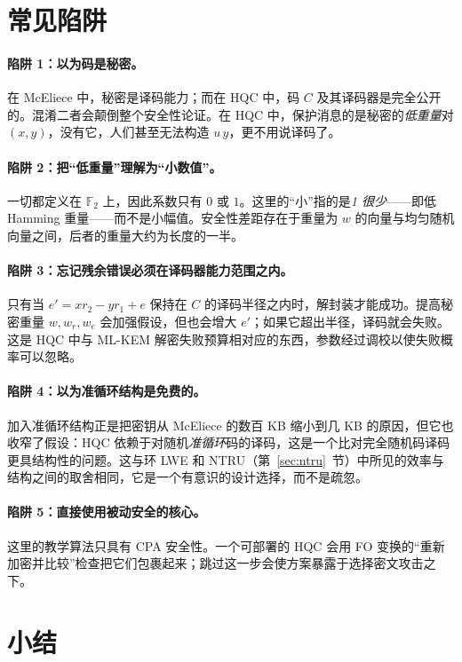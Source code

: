 \section{常见陷阱}

\paragraph{陷阱 1：以为码是秘密。}在 McEliece 中，秘密是译码能力；而在 HQC 中，码 $C$ 及其译码器是完全公开的。混淆二者会颠倒整个安全性论证。在 HQC 中，保护消息的是秘密的\emph{低重量}对 $(x,y)$，没有它，人们甚至无法构造 $u\,y$，更不用说译码了。

\paragraph{陷阱 2：把“低重量”理解为“小数值”。}一切都定义在 $\mathbb{F}_2$ 上，因此系数只有 $0$ 或 $1$。这里的“小”指的是\emph{1 很少}——即低 Hamming 重量——而不是小幅值。安全性差距存在于重量为 $w$ 的向量与均匀随机向量之间，后者的重量大约为长度的一半。

\paragraph{陷阱 3：忘记残余错误必须在译码器能力范围之内。}只有当 $e' = x r_2 - y r_1 + e$ 保持在 $C$ 的译码半径之内时，解封装才能成功。提高秘密重量 $w, w_r, w_e$ 会加强假设，但也会增大 $e'$；如果它超出半径，译码就会失败。这是 HQC 中与 ML-KEM 解密失败预算相对应的东西，参数经过调校以使失败概率可以忽略。

\paragraph{陷阱 4：以为准循环结构是免费的。}加入准循环结构正是把密钥从 McEliece 的数百 KB 缩小到几 KB 的原因，但它也收窄了假设：HQC 依赖于对随机\emph{准循环}码的译码，这是一个比对完全随机码译码更具结构性的问题。这与环 LWE 和 NTRU（第~\ref{sec:ntru}~节）中所见的效率与结构之间的取舍相同，它是一个有意识的设计选择，而不是疏忽。

\paragraph{陷阱 5：直接使用被动安全的核心。}这里的教学算法只具有 CPA 安全性。一个可部署的 HQC 会用 FO 变换的“重新加密并比较”检查把它们包裹起来；跳过这一步会使方案暴露于选择密文攻击之下。

\section{小结}

